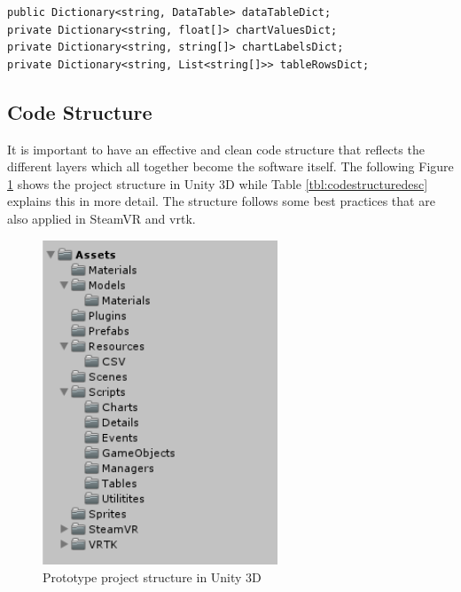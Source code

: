 \begin{lstlisting}[caption={Dictionary definitions for data storage during runtime}, label={lst:csharpdictionarydefinition}]
public Dictionary<string, DataTable> dataTableDict;
private Dictionary<string, float[]> chartValuesDict;
private Dictionary<string, string[]> chartLabelsDict;
private Dictionary<string, List<string[]>> tableRowsDict;
\end{lstlisting}



\subsection{Code Structure}

It is important to have an effective and clean code structure that reflects the different layers which all together become the software itself. The following Figure \ref{fig:unitycodestructure} shows the project structure in Unity 3D while Table \ref{tbl:codestructuredesc} explains this in more detail. The structure follows some best practices that are also applied in SteamVR and \gls{vrtk}.
\begin{figure}[h]
	\begin{center}
		\includegraphics[width=7cm]{03_Figures/08_Development/CodeStructure.png}
		\caption{Prototype project structure in Unity 3D}
		\label{fig:unitycodestructure}
	\end{center}
\end{figure}


